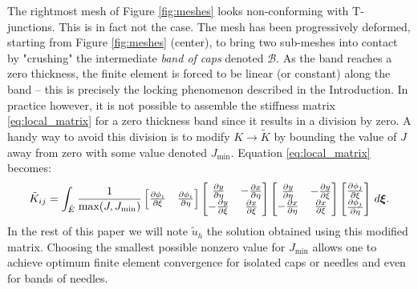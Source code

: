 \documentclass{article}
\theoremstyle{remark}
\def \d {{\rm d}}
\newcommand{\J}{J}
\newcommand{\Jmin}{J_{\text{min}}}
\newcommand{\dpartial}[2]{\frac{\partial #1}{\partial #2}}
\begin{document}
The rightmost mesh of Figure \ref{fig:meshes} 
looks non-conforming with T-junctions. This is in fact not the case. The mesh has been progressively deformed, starting from Figure \ref{fig:meshes} (center), to bring two sub-meshes into contact by "crushing" 
the intermediate \emph{band of caps} denoted $\mathcal{B}$. %
As the band reaches a zero thickness, the finite element is forced to
be linear (or constant) along the band -- this is precisely the locking phenomenon described in the Introduction.
In practice however, it is not possible to assemble the stiffness matrix \eqref{eq:local_matrix} for a zero thickness band since 
it results in a division by zero.
A handy way to avoid this division is to modify $K \rightarrow \tilde K$ by
bounding the value of $\J$ away from zero
with some value denoted $\Jmin$.
Equation \eqref{eq:local_matrix} becomes:
\begin{equation}
  \tilde K_{ij}
  = 
  \int_{\hat{E}}
\frac{1}{\text{max}(\J, \Jmin)}
  \begin{bmatrix}
    \dpartial {\phi_i}{\xi} & \dpartial{\phi_i}{\eta}
  \end{bmatrix} 
  \begin{bmatrix} 
    \dpartial y\eta & -\dpartial x\eta\\
    -\dpartial y\xi & \dpartial x\xi
  \end{bmatrix} 
  \begin{bmatrix} 
    \dpartial y\eta & -\dpartial y\xi\\
    -\dpartial x\eta & \dpartial x\xi
  \end{bmatrix} 
    \begin{bmatrix}
      \dpartial {\phi_j} \xi \\ \dpartial {\phi_j} \eta
    \end{bmatrix}
  \, \d \boldsymbol{\xi}.
  \label{eq:local_matrix_mod}
\end{equation}
In the rest of this paper we will note $\tilde{u}_h$ the solution obtained using this modified matrix.
Choosing the smallest possible nonzero value for $\Jmin$ allows one to achieve optimum finite element convergence for isolated caps or needles and even for bands of needles.
\end{document}
